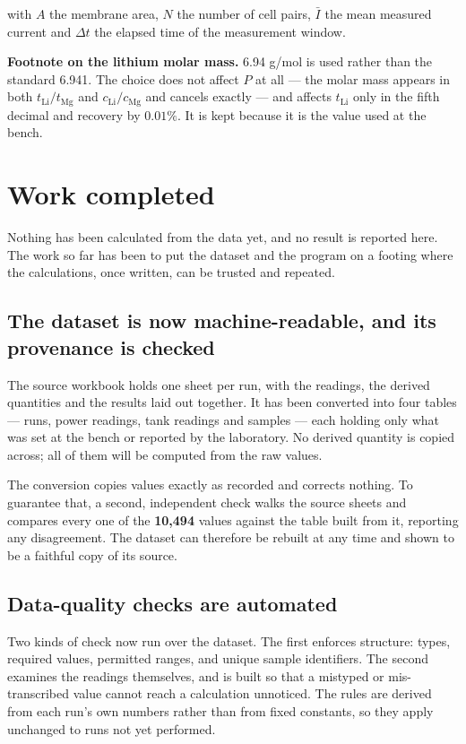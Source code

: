 \documentclass[11pt,a4paper]{article}
\begin{document}
with $A$ the membrane area, $N$ the number of cell pairs, $\bar{I}$ the mean measured current
and $\Delta t$ the elapsed time of the measurement window.

\footnotesize
\textbf{Footnote on the lithium molar mass.} 6.94 g/mol is used rather than the standard
6.941. The choice does not affect $P$ at all --- the molar mass appears in both
$t_{\mathrm{Li}}/t_{\mathrm{Mg}}$ and $c_{\mathrm{Li}}/c_{\mathrm{Mg}}$ and cancels exactly
--- and affects $t_{\mathrm{Li}}$ only in the fifth decimal and recovery by $0.01\%$. It is
kept because it is the value used at the bench.
\normalsize

\section{Work completed}

Nothing has been calculated from the data yet, and no result is reported here. The work so far
has been to put the dataset and the program on a footing where the calculations, once written,
can be trusted and repeated.

\subsection{The dataset is now machine-readable, and its provenance is checked}

The source workbook holds one sheet per run, with the readings, the derived quantities and the
results laid out together. It has been converted into four tables --- runs, power
readings, tank readings and samples --- each holding only what was set at the bench or
reported by the laboratory. No derived quantity is copied across; all of them will be computed
from the raw values.

The conversion copies values exactly as recorded and corrects nothing. To guarantee that, a
second, independent check walks the source sheets and compares every one of the
\textbf{10{,}494} values against the table built from it, reporting any disagreement. The
dataset can therefore be rebuilt at any time and shown to be a faithful copy of its source.

\subsection{Data-quality checks are automated}

Two kinds of check now run over the dataset. The first enforces structure: types, required
values, permitted ranges, and unique sample identifiers. The second examines the readings
themselves, and is built so that a mistyped or mis-transcribed value cannot reach a
calculation unnoticed. The rules are derived from each run's own numbers rather than from
fixed constants, so they apply unchanged to runs not yet performed.
\end{document}

